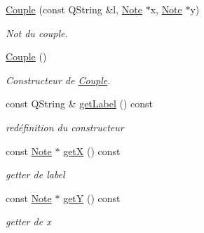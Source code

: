\begin{DoxyCompactItemize}
\item 
\mbox{\label{classCouple_ab0b5e66ed39d872431d285e0f5e547f3}} 
\hyperlink{classCouple_ab0b5e66ed39d872431d285e0f5e547f3}{Couple} (const Q\+String \&l, \hyperlink{classNote}{Note} $\ast$x, \hyperlink{classNote}{Note} $\ast$y)
\begin{DoxyCompactList}\small\item\em Not du couple. \end{DoxyCompactList}\item 
\mbox{\label{classCouple_a9302f43d53b9b947f2668c42ed196b79}} 
\hyperlink{classCouple_a9302f43d53b9b947f2668c42ed196b79}{Couple} ()
\begin{DoxyCompactList}\small\item\em Constructeur de \hyperlink{classCouple}{Couple}. \end{DoxyCompactList}\item 
\mbox{\label{classCouple_a0f04e0130d4d44ce39e322033d85a8df}} 
const Q\+String \& \hyperlink{classCouple_a0f04e0130d4d44ce39e322033d85a8df}{get\+Label} () const
\begin{DoxyCompactList}\small\item\em redéfinition du constructeur \end{DoxyCompactList}\item 
\mbox{\label{classCouple_a1360afaba2687fc85ff985d39051974a}} 
const \hyperlink{classNote}{Note} $\ast$ \hyperlink{classCouple_a1360afaba2687fc85ff985d39051974a}{getX} () const
\begin{DoxyCompactList}\small\item\em getter de label \end{DoxyCompactList}\item 
\mbox{\label{classCouple_a470aafc69542f36b366388154ff14957}} 
const \hyperlink{classNote}{Note} $\ast$ \hyperlink{classCouple_a470aafc69542f36b366388154ff14957}{getY} () const
\begin{DoxyCompactList}\small\item\em getter de x \end{DoxyCompactList}\item 
\mbox{\label{classCouple_aed5ff56ec61e0eb83113a5b81fc21c30}} 

\end{DoxyCompactItemize}
